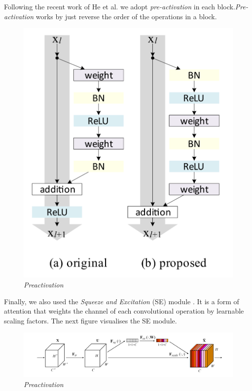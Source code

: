 \documentclass[../document.tex]{subfiles}
\begin{document}
Following the recent work of He et al. \cite{he2015identity} we adopt \emph{pre-activation} in each block.\emph{Pre-activation} works by just reverse the order of the operations in a block.

\begin{figure}[H]
	\centering
	\includegraphics[scale=0.2]{../img/implementation/estimator/preactivation.png}
	\caption{\emph{Preactivation}}
\end{figure}
Finally, we also used the \emph{Squeeze and Excitation} (SE) module \cite{hu2017squeeze}. It is a form of attention that weights the channel of each convolutional operation by learnable scaling factors. The next figure visualises the SE module.
\begin{figure}[H]
	\centering
	\includegraphics[width=\linewidth]{../img/implementation/estimator/se.png}
	\caption{\emph{Preactivation}}
\end{figure}
\end{document}
